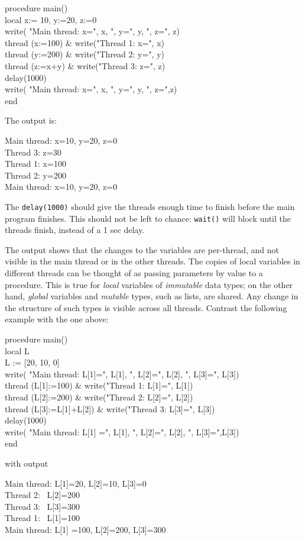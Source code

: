\begin{icode}
procedure main() \\
\> local x:= 10, y:=20, z:=0 \\
\> write( "Main thread: x=", x, ", y=", y, ", z=", z) \\
\> thread (x:=100) \& write("Thread 1: x=", x) \\
\> thread (y:=200) \& write("Thread 2: y=", y) \\
\> thread (z:=x+y) \& write("Thread 3: z=", z) \\
\> delay(1000) \\
\> write( "Main thread: x=", x, ", y=", y, ", z=",z) \\
end
\end{icode}
The output is:
\begin{icode}
Main thread: x=10, y=20, z=0 \\
Thread 3: z=30 \\
Thread 1: x=100 \\
Thread 2: y=200 \\
Main thread: x=10, y=20, z=0
\end{icode}

The \texttt{delay(1000)} should give the threads enough time to finish before
the main program finishes.  This should not be left to chance: \texttt{wait()}
will block until the threads finish, instead of a 1 sec delay.

The output shows that the changes to the variables are per-thread, and
not visible in the main thread or in the other threads.  The copies of
local variables in different threads can be thought of as passing
parameters by value to a procedure. This is true for \emph{local}
variables of \emph{immutable} data types; on the other hand,
\emph{global} variables and \emph{mutable} types, such as lists, are
shared.  Any change in the structure of such types is visible across
all threads.  Contrast the following example with the one above:

\begin{icode}
procedure main() \\
\> local L \\
\> L := [20, 10, 0] \\
\> write( "Main thread: L[1]=", L[1], ", L[2]=", L[2], ", L[3]=", L[3]) \\
\> thread (L[1]:=100) \& write("Thread 1: L[1]=", L[1]) \\
\> thread (L[2]:=200) \& write("Thread 2: L[2]=", L[2]) \\
\> thread (L[3]:=L[1]+L[2]) \& write("Thread 3: L[3]=", L[3]) \\
\> delay(1000) \\
\> write( "Main thread: L[1] =", L[1], ", L[2]=", L[2], ", L[3]=",L[3]) \\
end
\end{icode}
with output
\begin{icode}
Main thread: L[1]=20, L[2]=10, L[3]=0 \\
Thread 2: \ L[2]=200 \\
Thread 3: \ L[3]=300 \\
Thread 1: \ L[1]=100 \\
Main thread: L[1] =100, L[2]=200, L[3]=300
\end{icode}

